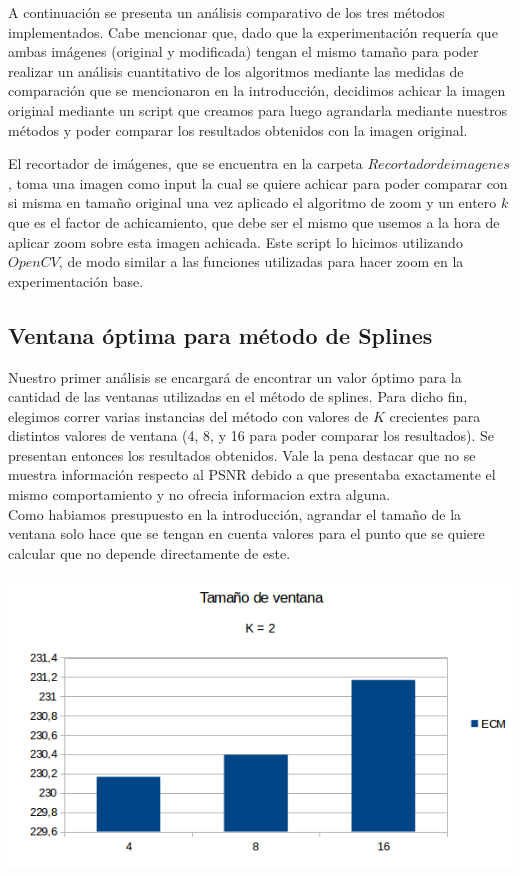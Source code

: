 A continuación se presenta un análisis comparativo de los tres métodos implementados.
Cabe mencionar que, dado que la experimentación requería que ambas imágenes (original y modificada) tengan el mismo tamaño para poder realizar un análisis cuantitativo de los algoritmos mediante las medidas de comparación que se mencionaron en la introducción, decidimos achicar la imagen original mediante un script que creamos para luego agrandarla mediante nuestros métodos y poder comparar los resultados obtenidos con la imagen original.

El recortador de imágenes, que se encuentra en la carpeta $Recortador de imagenes$, toma una imagen como input la cual se quiere achicar para poder comparar con si misma en tamaño original una vez aplicado el algoritmo de zoom y un entero $k$ que es el factor de achicamiento, que debe ser el mismo que usemos a la hora de aplicar zoom sobre esta imagen achicada. Este script lo hicimos utilizando $OpenCV$, de modo similar a las funciones utilizadas para hacer zoom en la experimentación base.

\subsection{Ventana óptima para método de Splines}
Nuestro primer análisis se encargará de encontrar un valor óptimo para la cantidad de las ventanas utilizadas en el método de splines.
Para dicho fin, elegimos correr varias instancias del método con valores de $K$ crecientes para distintos valores de ventana (4, 8, y 16 para poder comparar los resultados). Se presentan entonces los resultados obtenidos. Vale la pena destacar que no se muestra información respecto al PSNR debido a que presentaba exactamente el mismo comportamiento y no ofrecia informacion extra alguna.
\\
Como habiamos presupuesto en la introducción, agrandar el tamaño de la ventana solo hace que se tengan en cuenta valores para el punto que se quiere calcular que no depende directamente de este. 

\begin{center}
\includegraphics[scale=0.50]{imagenes/VK2.png}
\end{center}

